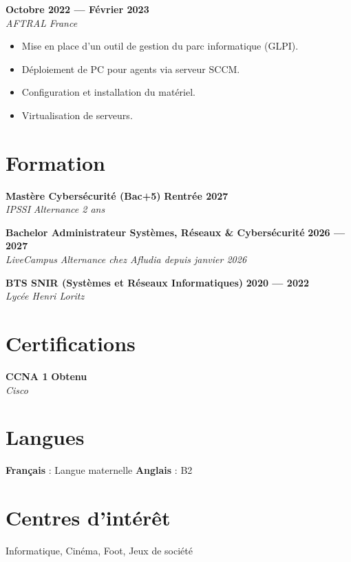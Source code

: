 \documentclass[10pt,a4paper]{article}
\begin{document}
\vspace{0.1cm}

 \hfill \textbf{Octobre 2022 — Février 2023} \\
\textit{AFTRAL} \hfill \textit{France}
\begin{itemize}[leftmargin=0.5cm, noitemsep, topsep=0pt, partopsep=0pt]
    \item Mise en place d'un outil de gestion du parc informatique (GLPI).
    \item Déploiement de PC pour agents via serveur SCCM.
    \item Configuration et installation du matériel.
    \item Virtualisation de serveurs.
\end{itemize}

\section*{Formation}

\noindent \textbf{Mastère Cybersécurité (Bac+5)} \hfill \textbf{Rentrée 2027} \\
\textit{IPSSI} \hfill \textit{Alternance 2 ans}

\vspace{0.1cm}

\noindent \textbf{Bachelor Administrateur Systèmes, Réseaux \& Cybersécurité} \hfill \textbf{2026 — 2027} \\
\textit{LiveCampus} \hfill \textit{Alternance chez Afludia depuis janvier 2026}

\vspace{0.1cm}

\noindent \textbf{BTS SNIR (Systèmes et Réseaux Informatiques)} \hfill \textbf{2020 — 2022} \\
\textit{Lycée Henri Loritz}

\section*{Certifications}

\noindent \textbf{CCNA 1} \hfill \textbf{Obtenu} \\
\textit{Cisco}

\section*{Langues}

\noindent \textbf{Français} : Langue maternelle \hfill \textbf{Anglais} : B2

\section*{Centres d'intérêt}

\noindent Informatique, Cinéma, Foot, Jeux de société
\end{document}
